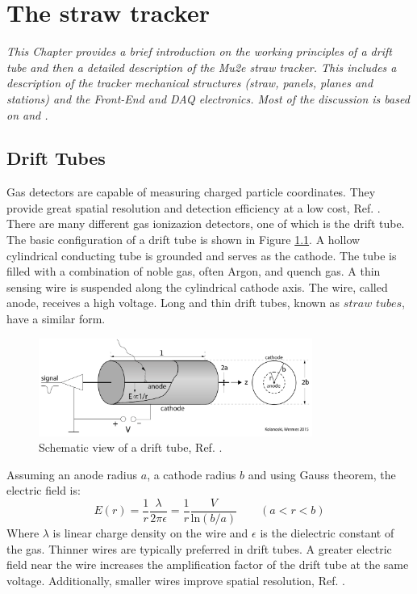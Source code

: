\chapter{The straw tracker}\label{chaptertrk}

\textit{This Chapter provides a brief introduction on the working principles 
of a drift tube and then a  detailed description of the Mu2e straw tracker. 
This includes a description of the tracker mechanical structures 
(straw, panels, planes and stations) and the Front-End and DAQ electronics. 
Most of the discussion is based on \cite{kola} and \cite{bobbb}.}

\section{Drift Tubes}
Gas detectors are capable of measuring charged particle coordinates. 
They provide great spatial resolution and detection efficiency at a low cost, Ref. \cite{kola}. 
There are many different gas ionizazion detectors, one of which is the drift tube.
The basic configuration of a drift tube is shown in Figure \ref{fig:drifttube}.
A hollow cylindrical conducting tube is grounded and serves as the cathode.
The tube is filled with a combination of noble gas, often Argon, and quench gas. 
A thin sensing wire is suspended along the cylindrical cathode axis. 
The wire, called anode, receives a high voltage. Long and thin drift tubes, known as $straw$ $tubes$, have a similar form.
\begin{figure}[!h]
    \centering
    \includegraphics[width =0.8\textwidth]{figures/png/Screenshot_20240324_232621.png}
    \caption[Schematic view of a drift tube.]{Schematic view of a drift tube, Ref. \cite{kola}.}
    \label{fig:drifttube}
    \end{figure}
Assuming an anode radius $a$, a cathode radius $b$ and using Gauss theorem, the electric field is:
\begin{equation}\label{avalanche}
    E(r)=\frac{1}{r}\frac{\lambda}{2\pi \epsilon}=\frac{1}{r}\frac{V}{ \text{ln}(b/a)} \qquad (a<r<b)
\end{equation}
Where $\lambda$ is linear charge density on the wire and $\epsilon$ is the dielectric constant of the gas.
Thinner wires are typically preferred in drift tubes. A greater electric field near the wire increases the amplification factor 
of the drift tube at the same voltage. Additionally, smaller wires improve spatial resolution, Ref. \cite{kola}. 
